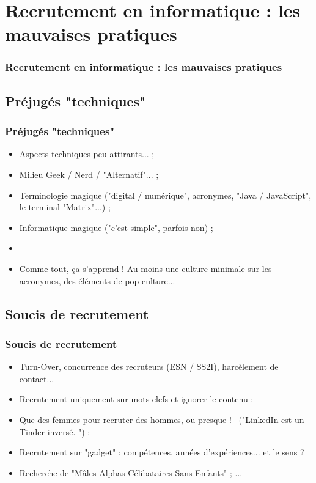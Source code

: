 \documentclass[slidetop,11pt]{beamer}
\begin{document}

\section{Recrutement en informatique : les mauvaises pratiques}
\begin{frame}
	\frametitle{Recrutement en informatique : les mauvaises pratiques}
	\tableofcontents[sections=2,currentsection,subsectionstyle=show/shaded/hide] %
\end{frame}

\subsection{Pr{\'e}jug{\'e}s "techniques"}
\begin{frame}
	\frametitle{Pr{\'e}jug{\'e}s "techniques"}
	\begin{itemize}
		\item Aspects techniques peu attirants... ; 
		\item Milieu Geek / Nerd / "Alternatif"... ; 
		\item Terminologie magique ("digital / num{\'e}rique", acronymes, "Java / JavaScript", le terminal "Matrix"...) ; 
		\item Informatique magique ("c'est simple", parfois non) ;  
		\item[] 
		\item Comme tout, \c{c}a s'apprend ! Au moins une culture minimale sur les acronymes, des {\'e}l{\'e}ments de pop-culture... 
	\end{itemize}
\end{frame}

\subsection{Soucis de recrutement}
\begin{frame}
	\frametitle{Soucis de recrutement}
	\begin{itemize}
		\item Turn-Over, concurrence des recruteurs (ESN / SS2I), harc{\`e}lement de contact... 
		\item Recrutement uniquement sur mots-clefs et ignorer le contenu ; 
		\item Que des femmes pour recruter des hommes, ou presque !~\newline
		("LinkedIn est un Tinder invers{\'e}. ") ; 
		\item Recrutement sur "gadget" : comp{\'e}tences, ann{\'e}es d'exp{\'e}riences... et le sens ?
		\item Recherche de "M{\^a}les Alphas C{\'e}libataires Sans Enfants" ; ...
	\end{itemize}
\end{frame}
\end{document}
